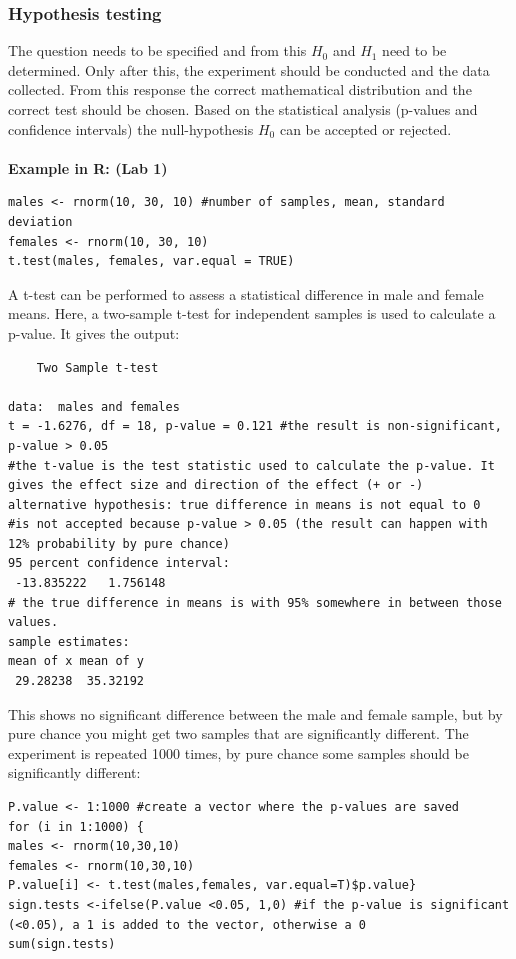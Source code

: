 \documentclass{article}
\begin{document}
\subsubsection{Hypothesis testing}
The question needs to be specified and from this $H_0$ and $H_1$ need to be determined. Only after this, the experiment should be conducted and the data collected. From this response the correct mathematical distribution and the correct test should be chosen. Based on the statistical analysis (p-values and confidence intervals) the null-hypothesis $H_0$ can be accepted or rejected.\\
\\

\textbf{Example in R: (Lab 1)}
\begin{lstlisting}
males <- rnorm(10, 30, 10) #number of samples, mean, standard deviation
females <- rnorm(10, 30, 10)
t.test(males, females, var.equal = TRUE)
\end{lstlisting}
A t-test can be performed to assess a statistical difference in male and female means. Here, a two-sample t-test for independent samples is used to calculate a p-value. It gives the output:\par
\begin{lstlisting}
	Two Sample t-test

data:  males and females
t = -1.6276, df = 18, p-value = 0.121 #the result is non-significant, p-value > 0.05
#the t-value is the test statistic used to calculate the p-value. It gives the effect size and direction of the effect (+ or -)
alternative hypothesis: true difference in means is not equal to 0
#is not accepted because p-value > 0.05 (the result can happen with 12% probability by pure chance)
95 percent confidence interval:
 -13.835222   1.756148
# the true difference in means is with 95% somewhere in between those values.
sample estimates:
mean of x mean of y 
 29.28238  35.32192 
\end{lstlisting}

This shows no significant difference between the male and female sample, but by pure chance you might get two samples that are significantly different. The experiment is repeated 1000 times, by pure chance some samples should be significantly different: \par
\begin{lstlisting}
P.value <- 1:1000 #create a vector where the p-values are saved
for (i in 1:1000) {
males <- rnorm(10,30,10)
females <- rnorm(10,30,10)
P.value[i] <- t.test(males,females, var.equal=T)$p.value}
sign.tests <-ifelse(P.value <0.05, 1,0) #if the p-value is significant (<0.05), a 1 is added to the vector, otherwise a 0
sum(sign.tests)
\end{lstlisting}
\end{document}
